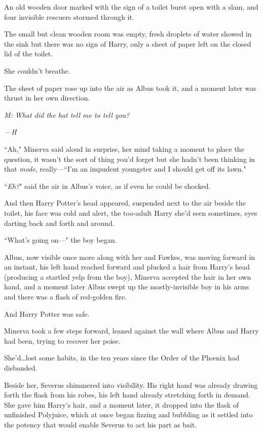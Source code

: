 An old wooden door marked with the sign of a toilet burst open with a slam, and four invisible rescuers stormed through it.

The small but clean wooden room was empty, fresh droplets of water showed in the sink but there was no sign of Harry, only a sheet of paper left on the closed lid of the toilet.

She couldn't breathe.

The sheet of paper rose up into the air as Albus took it, and a moment later was thrust in her own direction.

\emph{M: What did the hat tell me to tell you?}

\emph{—H}

``Ah," Minerva said aloud in surprise, her mind taking a moment to place the question, it wasn't the sort of thing you'd forget but she hadn't been thinking in that \emph{mode}, really—``I'm an impudent youngster and I should get off its lawn."

``\emph{Eh?}" said the air in Albus's voice, as if even he could be shocked.

And then Harry Potter's head appeared, suspended next to the air beside the toilet, his face was cold and alert, the too-adult Harry she'd seen sometimes, eyes darting back and forth and around.

``What's going on—" the boy began.

Albus, now visible once more along with her and Fawkes, was moving forward in an instant, his left hand reached forward and plucked a hair from Harry's head (producing a startled yelp from the boy), Minerva accepted the hair in her own hand, and a moment later Albus swept up the mostly-invisible boy in his arms and there was a flash of red-golden fire.

And Harry Potter was safe.

Minerva took a few steps forward, leaned against the wall where Albus and Harry had been, trying to recover her poise.

She'd…lost some habits, in the ten years since the Order of the Phœnix had disbanded.

Beside her, Severus shimmered into visibility. His right hand was already drawing forth the flask from his robes, his left hand already stretching forth in demand. She gave him Harry's hair, and a moment later, it dropped into the flask of unfinished Polyjuice, which at once began fizzing and bubbling as it settled into the potency that would enable Severus to act his part as bait.

